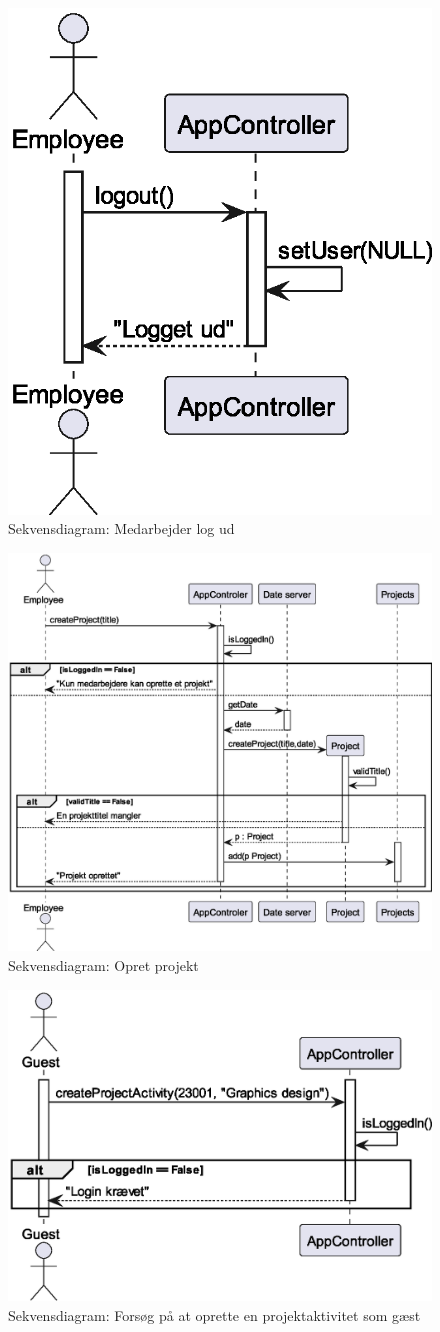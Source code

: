 \begin{figure}[H]
    \centering
    \caption{Sekvensdiagram: Medarbejder log ud}\label{fig:sequence_logout}
    \includegraphics[width = .3\textwidth]{Diagrams/Logout.eps}
\end{figure}
\begin{figure}[H]
    \centering
    \caption{Sekvensdiagram: Opret projekt}\label{fig:sequence_create_project}
    \includegraphics[width = .75\textwidth]{Diagrams/CreateProject.eps}
\end{figure}
\begin{figure}[H]
    \centering
    \caption{Sekvensdiagram: Forsøg på at oprette en projektaktivitet som gæst}\label{fig:sequence_create_PA_guest}
    \includegraphics[width = .5\textwidth]{Diagrams/createActivityNoPLGuest.eps}
\end{figure}
